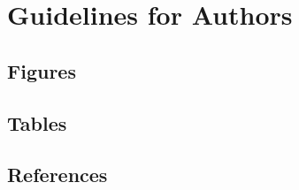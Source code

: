 \chapter{Guidelines for Authors}


\section{Figures}

\section{Tables}

\section{References}





























